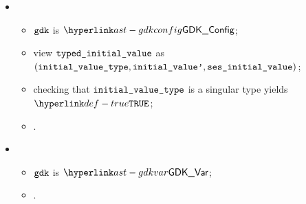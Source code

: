 \begin{itemize}
  \item {}
  \begin{itemize}
    \item $\gdk$ is $\GDKConfig$;
    \item view $\typedinitialvalue$ as \\ $(\initialvaluetype, \initialvaluep, \vsesinitialvalue)$;
    \item checking that $\initialvaluetype$ is a singular type yields $\True$\ProseOrTypeError;
    \item \Proseeqdef{$\newtenv$}{$\tenv$}.
  \end{itemize}

  \item {}
  \begin{itemize}
    \item $\gdk$ is $\GDKVar$;
    \item \Proseeqdef{$\newtenv$}{$\tenv$}.
  \end{itemize}
\end{itemize}

\FormallyParagraph
\begin{mathpar}
\end{mathpar}

\begin{mathpar}
\end{mathpar}

